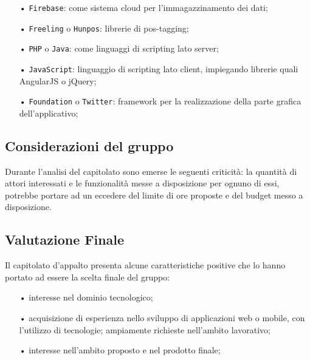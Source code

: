 \begin{itemize}
\item[•] \texttt{Firebase}: come sistema cloud per l'immagazzinamento dei dati;

\item[•] \texttt{Freeling} o \texttt{Hunpos}: librerie di pos-tagging;

\item[•] \texttt{PHP} o \texttt{Java}: come linguaggi di scripting lato server;

\item[•] \texttt{JavaScript}: linguaggio di scripting lato client, impiegando librerie quali AngularJS o jQuery;

\item[•] \texttt{Foundation} o \texttt{Twitter}: framework per la realizzazione della parte grafica dell’applicativo;

\end{itemize}

\subsection{Considerazioni del gruppo}
Durante l’analisi del capitolato sono emerse le seguenti criticità:
la quantità di attori interessati e le funzionalità messe a disposizione per ognuno di essi, potrebbe portare ad un eccedere del limite di ore proposte e del budget messo a disposizione.

\subsection{Valutazione Finale}
Il capitolato d’appalto presenta alcune caratteristiche positive che lo hanno portato ad essere
la scelta finale del gruppo:
\begin{itemize}
\item[•] interesse nel dominio tecnologico;
\item[•] acquisizione di esperienza nello sviluppo di applicazioni web o mobile, con l’utilizzo di tecnologie;
ampiamente richieste nell’ambito lavorativo;
\item[•] interesse nell'ambito proposto e nel prodotto finale; 

\end{itemize}

